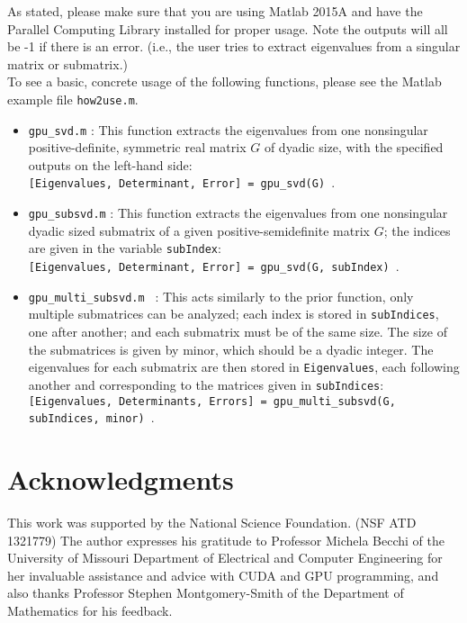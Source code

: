 \documentclass{amsart}
\begin{document}
As stated, please make sure that you are using Matlab 2015A and have the Parallel Computing Library installed for proper usage.  Note the outputs will all be -1 if there is an error. (i.e., the user tries to extract eigenvalues from a singular matrix or submatrix.)\\

To see a basic, concrete usage of the following functions, please see the Matlab example file {\tt how2use.m}.

\begin{itemize}
\item {\tt gpu\_svd.m} :  This function extracts the eigenvalues from one nonsingular positive-definite, symmetric real matrix $G$ of dyadic size, with the specified outputs on the left-hand side: \\  {\tt [Eigenvalues, Determinant, Error] = gpu\_svd(G) }. 
\item {\tt gpu\_subsvd.m} :  This function extracts the eigenvalues from one nonsingular dyadic sized submatrix of a given positive-semidefinite matrix $G$;  the indices are given in the variable {\tt subIndex}:  \\  {\tt [Eigenvalues, Determinant, Error] = gpu\_svd(G, subIndex) }.
\item {\tt gpu\_multi\_subsvd.m }  :  This acts similarly to the prior function, only multiple submatrices can be analyzed;  each index is stored in {\tt subIndices}, one after another;  and each submatrix must be of the same size.  The size of the submatrices is given by minor, which should be a dyadic integer.  The eigenvalues for each submatrix are then stored in {\tt Eigenvalues}, each following another and corresponding to the matrices given in {\tt subIndices}: \\
{\tt [Eigenvalues, Determinants, Errors] = gpu\_multi\_subsvd(G, subIndices, minor) }.
\end{itemize}


\section*{Acknowledgments}

\noindent
This work was supported by the National Science Foundation.  (NSF ATD 1321779)  The author expresses his gratitude to Professor Michela Becchi of the University of Missouri Department of Electrical and Computer Engineering for her invaluable assistance and advice with CUDA and GPU programming, and also thanks Professor Stephen Montgomery-Smith of the Department of Mathematics for his feedback.

\end{document}
